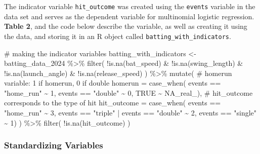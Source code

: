 \documentclass[
  letterpaper,
  DIV=11,
  numbers=noendperiod]{scrartcl}
\newenvironment{Shaded}{\begin{snugshade}}{\end{snugshade}}
\newcommand{\AttributeTok}[1]{\textcolor[rgb]{0.40,0.45,0.13}{#1}}
\newcommand{\CommentTok}[1]{\textcolor[rgb]{0.37,0.37,0.37}{#1}}
\newcommand{\ConstantTok}[1]{\textcolor[rgb]{0.56,0.35,0.01}{#1}}
\newcommand{\DecValTok}[1]{\textcolor[rgb]{0.68,0.00,0.00}{#1}}
\newcommand{\FunctionTok}[1]{\textcolor[rgb]{0.28,0.35,0.67}{#1}}
\newcommand{\NormalTok}[1]{\textcolor[rgb]{0.00,0.23,0.31}{#1}}
\newcommand{\OtherTok}[1]{\textcolor[rgb]{0.00,0.23,0.31}{#1}}
\newcommand{\SpecialCharTok}[1]{\textcolor[rgb]{0.37,0.37,0.37}{#1}}
\newcommand{\StringTok}[1]{\textcolor[rgb]{0.13,0.47,0.30}{#1}}
\begin{document}
The indicator variable \texttt{hit\_outcome} was created using the
\texttt{events} variable in the data set and serves as the dependent
variable for multinomial logistic regression. \textbf{Table 2}, and the
code below describe the variable, as well as creating it using the data,
and storing it in an R object called \texttt{batting\_with\_indicators}.

\begin{Shaded}
\begin{Highlighting}[]
\CommentTok{\# making the indicator variables  }
\NormalTok{batting\_with\_indicators }\OtherTok{\textless{}{-}}\NormalTok{ batting\_data\_2024 }\SpecialCharTok{\%\textgreater{}\%} 
  \FunctionTok{filter}\NormalTok{(}
    \SpecialCharTok{!}\FunctionTok{is.na}\NormalTok{(bat\_speed) }\SpecialCharTok{\&}
      \SpecialCharTok{!}\FunctionTok{is.na}\NormalTok{(swing\_length) }\SpecialCharTok{\&}
      \SpecialCharTok{!}\FunctionTok{is.na}\NormalTok{(launch\_angle) }\SpecialCharTok{\&}
      \SpecialCharTok{!}\FunctionTok{is.na}\NormalTok{(release\_speed)}
\NormalTok{    ) }\SpecialCharTok{\%\textgreater{}\%}
  \FunctionTok{mutate}\NormalTok{(}
    \CommentTok{\# homerun variable: 1 if homerun, 0 if double }
    \AttributeTok{homerun =} \FunctionTok{case\_when}\NormalTok{(}
\NormalTok{      events }\SpecialCharTok{==} \StringTok{"home\_run"} \SpecialCharTok{\textasciitilde{}} \DecValTok{1}\NormalTok{,}
\NormalTok{      events }\SpecialCharTok{==} \StringTok{"double"} \SpecialCharTok{\textasciitilde{}} \DecValTok{0}\NormalTok{,}
      \ConstantTok{TRUE} \SpecialCharTok{\textasciitilde{}} \ConstantTok{NA\_real\_}\NormalTok{),}
    \CommentTok{\# hit\_outcome corresponds to the type of hit }
    \AttributeTok{hit\_outcome =} \FunctionTok{case\_when}\NormalTok{(}
\NormalTok{      events }\SpecialCharTok{==} \StringTok{"home\_run"} \SpecialCharTok{\textasciitilde{}} \DecValTok{3}\NormalTok{,}
\NormalTok{      events }\SpecialCharTok{==} \StringTok{"triple"} \SpecialCharTok{|}\NormalTok{ events }\SpecialCharTok{==} \StringTok{"double"} \SpecialCharTok{\textasciitilde{}} \DecValTok{2}\NormalTok{,}
\NormalTok{      events }\SpecialCharTok{==} \StringTok{"single"} \SpecialCharTok{\textasciitilde{}} \DecValTok{1}\NormalTok{)}
\NormalTok{    ) }\SpecialCharTok{\%\textgreater{}\%}
  \FunctionTok{filter}\NormalTok{(}
    \SpecialCharTok{!}\FunctionTok{is.na}\NormalTok{(hit\_outcome)}
\NormalTok{    )}
\end{Highlighting}
\end{Shaded}

\subsubsection{Standardizing Variables}\label{standardizing-variables}
\end{document}
